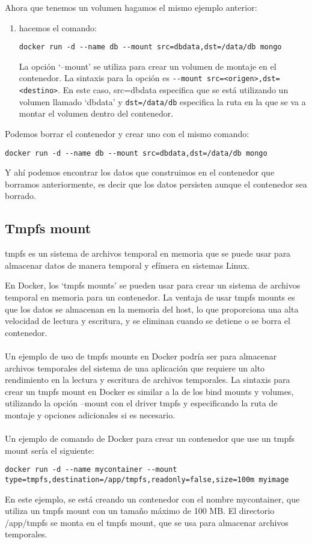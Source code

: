 \documentclass{article}
\begin{document}
Ahora que tenemos un volumen hagamos el mismo ejemplo anterior:
\begin{enumerate}
      \item hacemos el comando:
      \begin{lstlisting}[numbers=none]
docker run -d --name db --mount src=dbdata,dst=/data/db mongo \end{lstlisting}
La opción \enquote*{--mount} se utiliza para crear un volumen de montaje en el contenedor. La sintaxis para la opción es \lstinline{--mount src=<origen>,dst=<destino>}. En este caso, src=dbdata especifica que se está utilizando un volumen llamado \enquote*{dbdata} y \lstinline{dst=/data/db} especifica la ruta en la que se va a montar el volumen dentro del contenedor.           
\end{enumerate}
Podemos borrar el contenedor y crear uno con el mismo comando: 
\begin{lstlisting}[numbers=none]
docker run -d --name db --mount src=dbdata,dst=/data/db mongo \end{lstlisting}
Y ahí podemos encontrar los datos que construimos en el contenedor que borramos anteriormente, es decir que los datos persisten aunque el contenedor sea borrado.
\subsection{Tmpfs mount}
tmpfs es un sistema de archivos temporal en memoria que se puede usar para almacenar datos de manera temporal y efímera en sistemas Linux.

En Docker, los \enquote*{tmpfs mounts} se pueden usar para crear un sistema de archivos temporal en memoria para un contenedor. La ventaja de usar tmpfs mounts es que los datos se almacenan en la memoria del host, lo que proporciona una alta velocidad de lectura y escritura, y se eliminan cuando se detiene o se borra el contenedor.\\
\\
Un ejemplo de uso de tmpfs mounts en Docker podría ser para almacenar archivos temporales del sistema de una aplicación que requiere un alto rendimiento en la lectura y escritura de archivos temporales. La sintaxis para crear un tmpfs mount en Docker es similar a la de los bind mounts y volumes, utilizando la opción --mount con el driver tmpfs y especificando la ruta de montaje y opciones adicionales si es necesario.\\
\\
Un ejemplo de comando de Docker para crear un contenedor que use un tmpfs mount sería el siguiente:
\begin{lstlisting}[numbers=none]
docker run -d --name mycontainer --mount type=tmpfs,destination=/app/tmpfs,readonly=false,size=100m myimage\end{lstlisting}
En este ejemplo, se está creando un contenedor con el nombre mycontainer, que utiliza un tmpfs mount con un tamaño máximo de 100 MB. El directorio /app/tmpfs se monta en el tmpfs mount, que se usa para almacenar archivos temporales.
\end{document}

